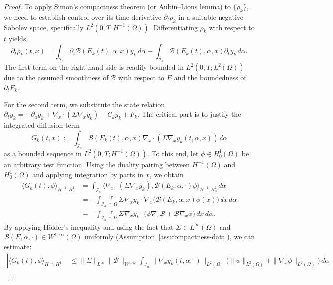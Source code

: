 \documentclass[pdflatex,sn-mathphys-num]{sn-jnl}
\theoremstyle{plain}
\theoremstyle{definition}
\theoremstyle{remark}
\begin{document}
\begin{proof}
To apply Simon's compactness theorem (or Aubin--Lions lemma) to \(\{\rho_k\}\), we need to establish control over its time derivative \(\partial_t \rho_k\) in a suitable negative Sobolev space, specifically \(L^2(0,T; H^{-1}(\Omega))\). Differentiating \(\rho_k\) with respect to \(t\) yields
\[
\partial_t \rho_k(t,x) = \int_{\mathcal I_a} \partial_t \mathcal B(E_k(t), \alpha, x) y_k \, d\alpha + \int_{\mathcal I_a} \mathcal B(E_k(t), \alpha, x) \partial_t y_k \, d\alpha .
\]
The first term on the right-hand side is readily bounded in \(L^2(0,T; L^2(\Omega))\) due to the assumed smoothness of \(\mathcal B\) with respect to \(E\) and the boundedness of \(\partial_t E_k\). 

For the second term, we substitute the state relation \(\partial_t y_k = -\partial_a y_k + \nabla_x \cdot (\Sigma \nabla_x y_k) - C_k y_k + F_k\). The critical part is to justify the integrated diffusion term
\[
G_k(t,x) := \int_{\mathcal I_a} \mathcal B(E_k(t), \alpha, x) \nabla_x \cdot (\Sigma \nabla_x y_k(t, \alpha, x)) \, d\alpha
\]
as a bounded sequence in \(L^2(0,T; H^{-1}(\Omega))\). To this end, let \(\phi \in H^1_0(\Omega)\) be an arbitrary test function. Using the duality pairing between \(H^{-1}(\Omega)\) and \(H^1_0(\Omega)\) and applying integration by parts in \(x\), we obtain
\begin{align*}
\langle G_k(t), \phi \rangle_{H^{-1}, H^1_0} 
&= \int_{\mathcal I_a} \langle \nabla_x \cdot (\Sigma \nabla_x y_k), \mathcal B(E_k, \alpha, \cdot)\phi \rangle_{H^{-1}, H^1_0} \, d\alpha \\
&= -\int_{\mathcal I_a} \int_\Omega \Sigma \nabla_x y_k \cdot \nabla_x \big( \mathcal B(E_k, \alpha, x) \phi(x) \big) \, dx \, d\alpha \\
&= -\int_{\mathcal I_a} \int_\Omega \Sigma \nabla_x y_k \cdot \big( \phi \nabla_x \mathcal B + \mathcal B \nabla_x \phi \big) \, dx \, d\alpha .
\end{align*}
By applying H\"{o}lder's inequality and using the fact that \(\Sigma \in L^\infty(\Omega)\) and \(\mathcal B(E, \alpha, \cdot) \in W^{1,\infty}(\Omega)\) uniformly (Assumption~\ref{ass:compactness-data}), we can estimate:
\begin{align*}
\left| \langle G_k(t), \phi \rangle_{H^{-1}, H^1_0} \right| 
&\le \|\Sigma\|_{L^\infty} \|\mathcal B\|_{W^{1,\infty}} \int_{\mathcal I_a} \|\nabla_x y_k(t,\alpha,\cdot)\|_{L^2(\Omega)} \big( \|\phi\|_{L^2(\Omega)} + \|\nabla_x \phi\|_{L^2(\Omega)} \big) \, d\alpha \\

\end{align*}
\end{proof}
\end{document}
